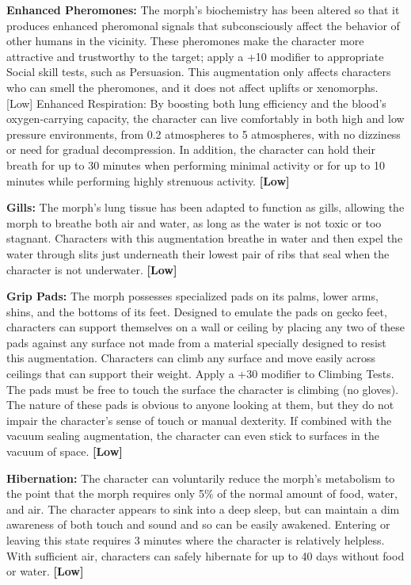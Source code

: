 \textbf{Enhanced Pheromones: }The morph’s biochemistry has been altered so that it produces enhanced pheromonal signals that subconsciously affect the behavior of other humans in the vicinity. These pheromones make the character more attractive and trustworthy to the target; apply a +10 modifier to appropriate Social skill tests, such as Persuasion. This augmentation only affects characters who can smell the pheromones, and it does not affect uplifts or xenomorphs. [Low] Enhanced Respiration: By boosting both lung efficiency and the blood’s oxygen-carrying capacity, the character can live comfortably in both high and low pressure environments, from 0.2 atmospheres to 5 atmospheres, with no dizziness or need for gradual decompression. In addition, the character can hold their breath for up to 30 minutes when performing minimal activity or for up to 10 minutes while performing highly strenuous activity. \textbf{[Low]} 

\textbf{Gills:} The morph’s lung tissue has been adapted to function as gills, allowing the morph to breathe both air and water, as long as the water is not toxic or too stagnant. Characters with this augmentation breathe in water and then expel the water through slits just underneath their lowest pair of ribs that seal when the character is not underwater. \textbf{[Low]} 

\textbf{Grip Pads:} The morph possesses specialized pads on its palms, lower arms, shins, and the bottoms of its feet. Designed to emulate the pads on gecko feet, characters can support themselves on a wall or ceiling by placing any two of these pads against any surface not made from a material specially designed to resist this augmentation. Characters can climb any surface and move easily across ceilings that can support their weight. Apply a +30 modifier to Climbing Tests. The pads must be free to touch the surface the character is climbing (no gloves). The nature of these pads is obvious to anyone looking at them, but they do not impair the character’s sense of touch or manual dexterity. If combined with the vacuum sealing augmentation, the character can even stick to surfaces in the vacuum of space. \textbf{[Low]} 

\textbf{Hibernation:} The character can voluntarily reduce the morph’s metabolism to the point that the morph requires only 5\% of the normal amount of food, water, and air. The character appears to sink into a deep sleep, but can maintain a dim awareness of both touch and sound and so can be easily awakened. Entering or leaving this state requires 3 minutes where the character is relatively helpless. With sufficient air, characters can safely hibernate for up to 40 days without food or water. \textbf{[Low]} 

